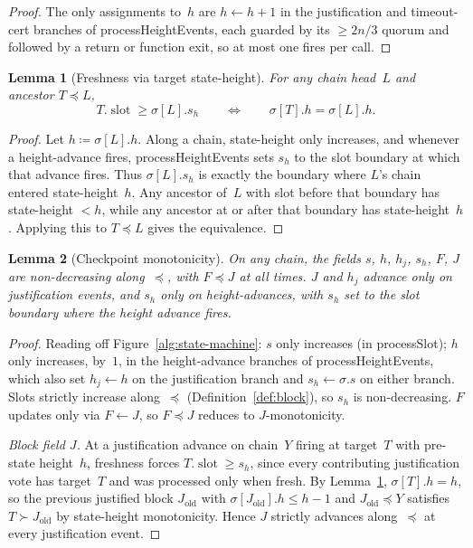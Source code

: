 \ifx\litemode\undefined\documentclass{article}\fi
\newcommand{\slot}[0]{\ensuremath{\operatorname{\mathrm{slot}}}}
\newcommand{\processSlot}{\textsf{processSlot}\xspace}
\newcommand{\processHeightEvents}{\textsf{processHeightEvents}\xspace}
\theoremstyle{plain}
\newtheorem{lemma}{Lemma}
\theoremstyle{definition}
\theoremstyle{remark}
\begin{document}
\begin{proof}
The only assignments to~$h$ are $h \gets h + 1$ in the justification and timeout-cert branches of \processHeightEvents, each guarded by its $\geq 2n/3$ quorum and followed by a return or function exit, so at most one fires per call.
\end{proof}

\begin{lemma}[Freshness via target state-height]\label{lem:fresh-equiv}
For any chain head~$L$ and ancestor $T \preceq L$,
\[
  T.\slot \geq \sigma[L].s_h
  \qquad\Longleftrightarrow\qquad
  \sigma[T].h = \sigma[L].h .
\]
\end{lemma}

\begin{proof}
Let $h \coloneqq \sigma[L].h$.
Along a chain, state-height only increases, and whenever a height-advance fires, \processHeightEvents sets $s_h$ to the slot boundary at which that advance fires.
Thus $\sigma[L].s_h$ is exactly the boundary where $L$'s chain entered state-height~$h$.
Any ancestor of~$L$ with slot before that boundary has state-height $< h$, while any ancestor at or after that boundary has state-height~$h$.
Applying this to $T \preceq L$ gives the equivalence.
\end{proof}

\begin{lemma}[Checkpoint monotonicity]\label{lem:slotmono}
On any chain, the fields $s$, $h$, $h_j$, $s_h$, $F$, $J$ are non-decreasing along~$\preceq$, with $F \preceq J$ at all times.
$J$ and $h_j$ advance only on justification events, and $s_h$ only on height-advances, with $s_h$ set to the slot boundary where the height advance fires.
\end{lemma}

\begin{proof}
Reading off Figure~\ref{alg:state-machine}: $s$ only increases (in \processSlot); $h$ only increases, by~$1$, in the height-advance branches of \processHeightEvents, which also set $h_j \gets h$ on the justification branch and $s_h \gets \sigma.s$ on either branch.
Slots strictly increase along~$\preceq$ (Definition~\ref{def:block}), so $s_h$ is non-decreasing.
$F$ updates only via $F \gets J$, so $F \preceq J$ reduces to $J$-monotonicity.

\emph{Block field $J$.}
At a justification advance on chain~$Y$ firing at target~$T$ with pre-state height~$h$, freshness forces $T.\slot \geq s_h$, since every contributing justification vote has target~$T$ and was processed only when fresh.
By Lemma~\ref{lem:fresh-equiv}, $\sigma[T].h = h$, so the previous justified block $J_{\mathrm{old}}$ with $\sigma[J_{\mathrm{old}}].h \leq h-1$ and $J_{\mathrm{old}} \preceq Y$ satisfies $T \succ J_{\mathrm{old}}$ by state-height monotonicity.
Hence $J$ strictly advances along~$\preceq$ at every justification event.
\end{proof}
\end{document}
